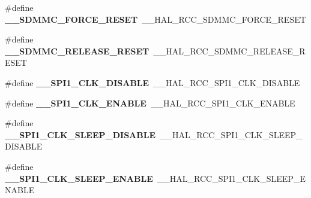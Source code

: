 \begin{DoxyCompactItemize}
\item 
\hypertarget{group___h_a_l___r_c_c___aliased_ga7682a64b595f3acd375f5a3ad9be9372}{\#define {\bfseries \-\_\-\-\_\-\-S\-D\-M\-M\-C\-\_\-\-F\-O\-R\-C\-E\-\_\-\-R\-E\-S\-E\-T}~\-\_\-\-\_\-\-H\-A\-L\-\_\-\-R\-C\-C\-\_\-\-S\-D\-M\-M\-C\-\_\-\-F\-O\-R\-C\-E\-\_\-\-R\-E\-S\-E\-T}\label{group___h_a_l___r_c_c___aliased_ga7682a64b595f3acd375f5a3ad9be9372}

\item 
\hypertarget{group___h_a_l___r_c_c___aliased_gaa5f53ce88ee0263305d9a45473927454}{\#define {\bfseries \-\_\-\-\_\-\-S\-D\-M\-M\-C\-\_\-\-R\-E\-L\-E\-A\-S\-E\-\_\-\-R\-E\-S\-E\-T}~\-\_\-\-\_\-\-H\-A\-L\-\_\-\-R\-C\-C\-\_\-\-S\-D\-M\-M\-C\-\_\-\-R\-E\-L\-E\-A\-S\-E\-\_\-\-R\-E\-S\-E\-T}\label{group___h_a_l___r_c_c___aliased_gaa5f53ce88ee0263305d9a45473927454}

\item 
\hypertarget{group___h_a_l___r_c_c___aliased_ga1e51511e17773155e0ef0a1d45a82829}{\#define {\bfseries \-\_\-\-\_\-\-S\-P\-I1\-\_\-\-C\-L\-K\-\_\-\-D\-I\-S\-A\-B\-L\-E}~\-\_\-\-\_\-\-H\-A\-L\-\_\-\-R\-C\-C\-\_\-\-S\-P\-I1\-\_\-\-C\-L\-K\-\_\-\-D\-I\-S\-A\-B\-L\-E}\label{group___h_a_l___r_c_c___aliased_ga1e51511e17773155e0ef0a1d45a82829}

\item 
\hypertarget{group___h_a_l___r_c_c___aliased_ga449f86b99a03b2929d1fa3c3895d5df9}{\#define {\bfseries \-\_\-\-\_\-\-S\-P\-I1\-\_\-\-C\-L\-K\-\_\-\-E\-N\-A\-B\-L\-E}~\-\_\-\-\_\-\-H\-A\-L\-\_\-\-R\-C\-C\-\_\-\-S\-P\-I1\-\_\-\-C\-L\-K\-\_\-\-E\-N\-A\-B\-L\-E}\label{group___h_a_l___r_c_c___aliased_ga449f86b99a03b2929d1fa3c3895d5df9}

\item 
\hypertarget{group___h_a_l___r_c_c___aliased_ga7a2a76db53db384ea1bc6e056a0190e7}{\#define {\bfseries \-\_\-\-\_\-\-S\-P\-I1\-\_\-\-C\-L\-K\-\_\-\-S\-L\-E\-E\-P\-\_\-\-D\-I\-S\-A\-B\-L\-E}~\-\_\-\-\_\-\-H\-A\-L\-\_\-\-R\-C\-C\-\_\-\-S\-P\-I1\-\_\-\-C\-L\-K\-\_\-\-S\-L\-E\-E\-P\-\_\-\-D\-I\-S\-A\-B\-L\-E}\label{group___h_a_l___r_c_c___aliased_ga7a2a76db53db384ea1bc6e056a0190e7}

\item 
\hypertarget{group___h_a_l___r_c_c___aliased_ga4827d1af8789446e75722131ef5fcd4c}{\#define {\bfseries \-\_\-\-\_\-\-S\-P\-I1\-\_\-\-C\-L\-K\-\_\-\-S\-L\-E\-E\-P\-\_\-\-E\-N\-A\-B\-L\-E}~\-\_\-\-\_\-\-H\-A\-L\-\_\-\-R\-C\-C\-\_\-\-S\-P\-I1\-\_\-\-C\-L\-K\-\_\-\-S\-L\-E\-E\-P\-\_\-\-E\-N\-A\-B\-L\-E}\label{group___h_a_l___r_c_c___aliased_ga4827d1af8789446e75722131ef5fcd4c}


\end{DoxyCompactItemize}
